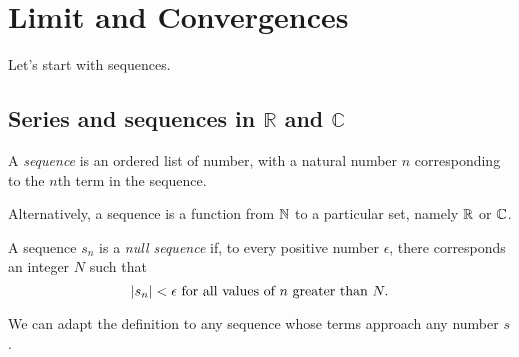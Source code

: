 \documentclass[main.tex]{subfiles}
\begin{document}
	\section{Limit and Convergences}
	Let's start with sequences.
	\subsection{Series and sequences in $\mathbb{R}$ and $\mathbb{C}$}
	\begin{definition}
		A \textit{sequence} is an ordered list of number, with a natural number $n$ corresponding to the $n$th term in the sequence.
		
		Alternatively, a sequence is a function from $\NN$ to a particular set, namely $\RR$ or $\CC$.
	\end{definition}
	\begin{definition}
		A sequence $s_n$ is a \textit{null sequence} if, to every positive number $\epsilon$, there corresponds an integer $N$ such that
		\begin{equation*}
		\abs*{s_n} < \epsilon \text{ for all values of $n$ greater than } N.
		\end{equation*}
	\end{definition}
	
	We can adapt the definition to any sequence whose terms approach any number $s$.
	
\end{document}
